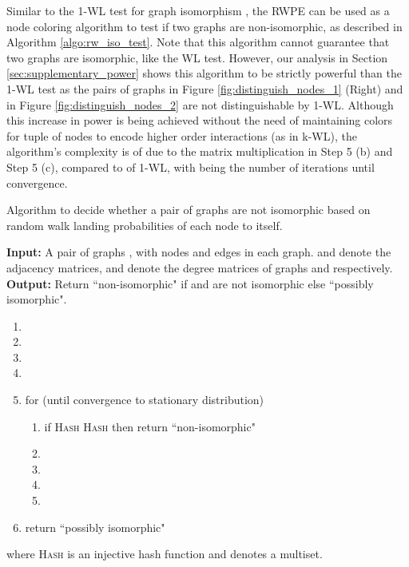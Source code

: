 \documentclass{article} \usepackage{iclr2021_conference,times}
\begin{document}
Similar to the 1-WL test for graph isomorphism \citep{weisfeiler1968reduction, morris2019weisfeiler, sato2020survey}, the RWPE can be used as a node coloring algorithm to test if two graphs are non-isomorphic, as described in Algorithm \ref{algo:rw_iso_test}. Note that this algorithm cannot guarantee that two graphs are isomorphic, like the WL test. However, our analysis in Section \ref{sec:supplementary_power} shows this algorithm to be strictly powerful than the 1-WL test as the pairs of graphs in Figure \ref{fig:distinguish_nodes_1} (Right) and in Figure \ref{fig:distinguish_nodes_2} are not distinguishable by 1-WL. Although this increase in power is being achieved without the need of maintaining colors for tuple of nodes to encode higher order interactions (as in k-WL), the algorithm's complexity is of  due to the matrix multiplication in Step 5 (b) and Step 5 (c), compared to  of 1-WL, with  being the number of iterations until convergence.

\begin{algorithm}
\caption{Algorithm to decide whether a pair of graphs are not isomorphic based on random walk landing probabilities of each node to itself.}


\textbf{Input:} A pair of graphs ,  with  nodes and  edges in each graph.  and  denote the adjacency matrices,  and  denote the degree matrices of graphs  and  respectively.\\
\textbf{Output:} Return ``non-isomorphic" if  and  are not isomorphic else ``possibly isomorphic".
\begin{enumerate}
    \item 
    \item 
    \item 
    \item 
    \item for  (until convergence to stationary distribution)
    \begin{enumerate}
        \item if \textsc{Hash} \textsc{Hash} then return ``non-isomorphic"
        \item 
        \item 
        \item 
        \item 
    \end{enumerate}
    \item return ``possibly isomorphic"
\end{enumerate}

\label{algo:rw_iso_test}
\end{algorithm}
where \textsc{Hash} is an injective hash function and  denotes a multiset.
\end{document}
